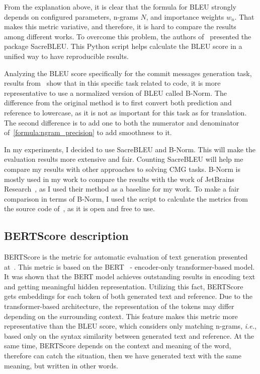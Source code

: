 From the explanation above, it is clear that the formula for BLEU strongly depends on configured parameters, n-grams $N$, and importance weights $w_n$. That makes this metric variative, and therefore, it is hard to compare the results among different works. To overcome this problem, the authors of~\cite{post2018call} presented the package SacreBLEU\@. This Python script helps calculate the BLEU score in a unified way to have reproducible results.

Analyzing the BLEU score specifically for the commit messages generation task, results from~\cite{tao2021evaluation} show that in this specific task related to code, it is more representative to use a normalized version of BLEU called B-Norm. The difference from the original method is to first convert both prediction and reference to lowercase, as it is not as important for this task as for translation. The second difference is to add one to both the numerator and denominator of~\ref{formula:ngram_precision} to add smoothness to it.

In my experiments, I decided to use SacreBLEU and B-Norm. This will make the evaluation results more extensive and fair. Counting SacreBLEU will help me compare my results with other approaches to solving CMG tasks. B-Norm is mostly used in my work to compare the results with the work of JetBrains Research~\cite{eliseeva2023commit}, as I used their method as a baseline for my work. To make a fair comparison in terms of B-Norm, I used the script to calculate the metrics from the source code of~\cite{eliseeva2023commit}, as it is open and free to use.

\subsection{BERTScore description}\label{subec:bertscore}
BERTScore is the metric for automatic evaluation of text generation presented at~\cite{zhang2019bertscore}. This metric is based on the BERT~\cite{devlin2018bert} {-} encoder-only transformer-based model. It was shown that the BERT model achieves outstanding results in encoding text and getting meaningful hidden representation. Utilizing this fact, BERTScore gets embeddings for each token of both generated text and reference. Due to the transformer-based architecture, the representation of the tokens may differ depending on the surrounding context. This feature makes this metric more representative than the BLEU score, which considers only matching n-grams, \textit{i.e.}, based only on the syntax similarity between generated text and reference. At the same time, BERTScore depends on the context and meaning of the word, therefore can catch the situation, then we have generated text with the same meaning, but written in other words.

